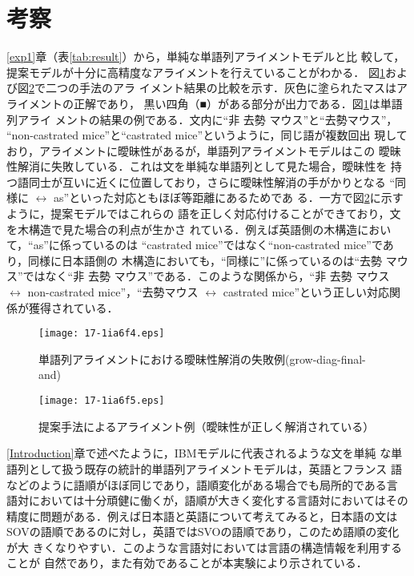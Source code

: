 \documentclass[japanese]{jnlp_1.4}
\begin{document}
\section{考察}

\ref{exp1}章（表\ref{tab:result}）から，単純な単語列アライメントモデルと比
較して，提案モデルが十分に高精度なアライメントを行えていることがわかる．
図\ref{fig:word_align}および図\ref{fig:proposed_align}で二つの手法のアラ
イメント結果の比較を示す．灰色に塗られたマスはアライメントの正解であり，
黒い四角（■）がある部分が出力である．図\ref{fig:word_align}は単語列アライ
メントの結果の例である．文内に“非 去勢 マウス”と“去勢マウス”，
``non-castrated mice''と``castrated mice''というように，同じ語が複数回出
現しており，アライメントに曖昧性があるが，単語列アライメントモデルはこの
曖昧性解消に失敗している．これは文を単純な単語列として見た場合，曖昧性を
持つ語同士が互いに近くに位置しており，さらに曖昧性解消の手がかりとなる
“同様に $\leftrightarrow$ as”といった対応ともほぼ等距離にあるためであ
る．一方で図\ref{fig:proposed_align}に示すように，提案モデルではこれらの
語を正しく対応付けることができており，文を木構造で見た場合の利点が生かさ
れている．例えば英語側の木構造において，``as''に係っているのは
``castrated mice''ではなく``non-castrated mice''であり，同様に日本語側の
木構造においても，“同様に”に係っているのは“去勢 マウス”ではなく“非 
去勢 マウス”である．このような関係から，“非 去勢 マウス 
$\leftrightarrow$ non-castrated mice”，“去勢マウス $\leftrightarrow$
castrated mice”という正しい対応関係が獲得されている．


\begin{figure}[t]
 \begin{center}
  \texttt{[image: 17-1ia6f4.eps]}
 \end{center}
  \caption{単語列アライメントにおける曖昧性解消の失敗例(grow-diag-final-and)}
  \label{fig:word_align}
\end{figure}
\begin{figure}[t]
 \begin{center}
  \texttt{[image: 17-1ia6f5.eps]}
 \end{center}
  \caption{提案手法によるアライメント例（曖昧性が正しく解消されている）}
  \label{fig:proposed_align}
\end{figure}


\ref{Introduction}章で述べたように，IBMモデルに代表されるような文を単純
な単語列として扱う既存の統計的単語列アライメントモデルは，英語とフランス
語などのように語順がほぼ同じであり，語順変化がある場合でも局所的である言
語対においては十分頑健に働くが，語順が大きく変化する言語対においてはその
精度に問題がある．例えば日本語と英語について考えてみると，日本語の文は
SOVの語順であるのに対し，英語ではSVOの語順であり，このため語順の変化が大
きくなりやすい．このような言語対においては言語の構造情報を利用することが
自然であり，また有効であることが本実験により示されている．
\end{document}
